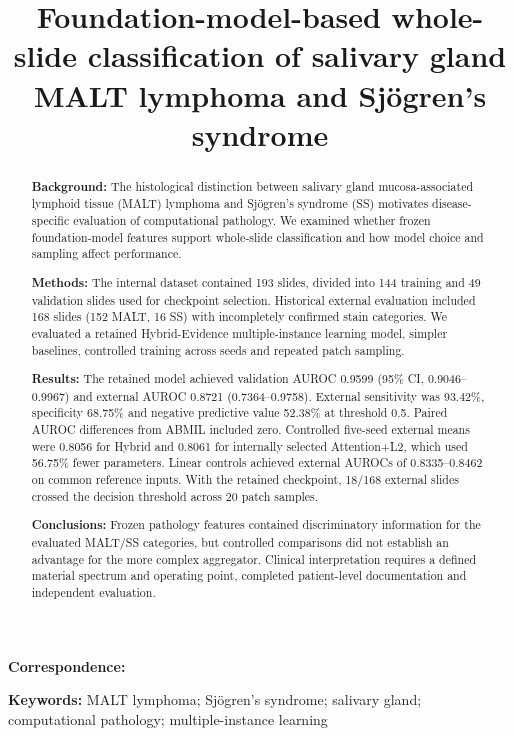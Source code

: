 \title{Foundation-model-based whole-slide classification of salivary gland MALT lymphoma and Sjögren's syndrome}
\author{}
\date{}
\maketitle
\textbf{Correspondence:} 

\begin{abstract}
\textbf{Background:} The histological distinction between salivary gland mucosa-associated lymphoid tissue (MALT) lymphoma and Sjögren's syndrome (SS) motivates disease-specific evaluation of computational pathology. We examined whether frozen foundation-model features support whole-slide classification and how model choice and sampling affect performance.

\textbf{Methods:} The internal dataset contained 193 slides, divided into 144 training and 49 validation slides used for checkpoint selection. Historical external evaluation included 168 slides (152 MALT, 16 SS) with incompletely confirmed stain categories. We evaluated a retained Hybrid-Evidence multiple-instance learning model, simpler baselines, controlled training across seeds and repeated patch sampling.

\textbf{Results:} The retained model achieved validation AUROC 0.9599 (95\% CI, 0.9046--0.9967) and external AUROC 0.8721 (0.7364--0.9758). External sensitivity was 93.42\%, specificity 68.75\% and negative predictive value 52.38\% at threshold 0.5. Paired AUROC differences from ABMIL included zero. Controlled five-seed external means were 0.8056 for Hybrid and 0.8061 for internally selected Attention+L2, which used 56.75\% fewer parameters. Linear controls achieved external AUROCs of 0.8335--0.8462 on common reference inputs. With the retained checkpoint, 18/168 external slides crossed the decision threshold across 20 patch samples.

\textbf{Conclusions:} Frozen pathology features contained discriminatory information for the evaluated MALT/SS categories, but controlled comparisons did not establish an advantage for the more complex aggregator. Clinical interpretation requires a defined material spectrum and operating point, completed patient-level documentation and independent evaluation.
\end{abstract}
\textbf{Keywords:} MALT lymphoma; Sjögren's syndrome; salivary gland; computational pathology; multiple-instance learning
